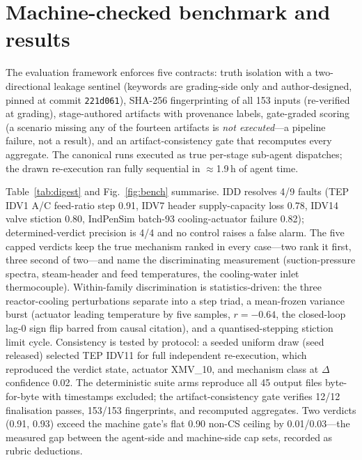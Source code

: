 \documentclass[10pt]{article}
\begin{document}
\section{Machine-checked benchmark and results}
The evaluation framework enforces five contracts: truth isolation with a two-directional leakage sentinel (keywords are grading-side only and author-designed, pinned at commit \texttt{221d061}), SHA-256 fingerprinting of all 153 inputs (re-verified at grading), stage-authored artifacts with provenance labels, gate-graded scoring (a scenario missing any of the fourteen artifacts is \emph{not executed}---a pipeline failure, not a result), and an artifact-consistency gate that recomputes every aggregate. The canonical runs executed as true per-stage sub-agent dispatches; the drawn re-execution ran fully sequential in $\approx$1.9\,h of agent time.

Table~\ref{tab:digest} and Fig.~\ref{fig:bench} summarise. IDD resolves 4/9 faults (TEP IDV1 A/C feed-ratio step 0.91, IDV7 header supply-capacity loss 0.78, IDV14 valve stiction 0.80, IndPenSim batch-93 cooling-actuator failure 0.82); determined-verdict precision is 4/4 and no control raises a false alarm. The five capped verdicts keep the true mechanism ranked in every case---two rank it first, three second of two---and name the discriminating measurement (suction-pressure spectra, steam-header and feed temperatures, the cooling-water inlet thermocouple). Within-family discrimination is statistics-driven: the three reactor-cooling perturbations separate into a step triad, a mean-frozen variance burst (actuator leading temperature by five samples, $r{=}{-}0.64$, the closed-loop lag-0 sign flip barred from causal citation), and a quantised-stepping stiction limit cycle. Consistency is tested by protocol: a seeded uniform draw (seed released) selected TEP IDV11 for full independent re-execution, which reproduced the verdict state, actuator XMV\_10, and mechanism class at $\Delta$confidence 0.02. The deterministic suite arms reproduce all 45 output files byte-for-byte with timestamps excluded; the artifact-consistency gate verifies 12/12 finalisation passes, 153/153 fingerprints, and recomputed aggregates. Two verdicts (0.91, 0.93) exceed the machine gate's flat 0.90 non-CS ceiling by 0.01/0.03---the measured gap between the agent-side and machine-side cap sets, recorded as rubric deductions.
\end{document}
